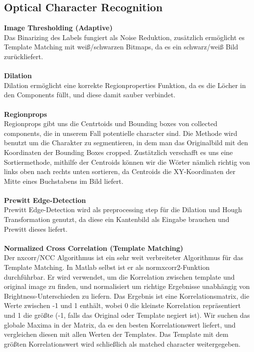 \documentclass[paper=A4, deutsch]{scrartcl}
\begin{document}
\subsection{Optical Character Recognition}
\textbf{Image Thresholding (Adaptive)}\\
Das Binarizing des Labels fungiert als Noise Reduktion, zusätzlich ermöglicht es Template Matching mit weiß/schwarzen Bitmaps, da es ein schwarz/weiß Bild zurückliefert.\\
\\
\textbf{Dilation}\\
Dilation ermöglicht eine korrekte Regionproperties Funktion, da es die Löcher in den Components füllt, und diese damit sauber verbindet.\\
\\
\textbf{Regionprops}\\
Regionprops gibt uns die Centrtoids und Bounding boxes von collected components, die in unserem Fall potentielle character sind. Die Methode wird benutzt um die Charakter zu segmentieren, in dem man das Originalbild mit den Koordinaten der Bounding Boxes cropped. Zustätzlich verschafft es uns eine Sortiermethode, mithilfe der Centroids können wir die Wörter nämlich richtig von links oben nach rechts unten sortieren,
da Centroids die XY-Koordinaten der Mitte eines Buchstabens im Bild liefert.\\
\\
\textbf{Prewitt Edge-Detection}\\
Prewitt Edge-Detection wird als preprocessing step für die Dilation und Hough Transformation genutzt, da diese ein Kantenbild als Eingabe brauchen und Prewitt dieses liefert.\\
\\
\textbf{Normalized Cross Correlation (Template Matching)} \cite{nip}\\
Der nxcorr/NCC Algorithmus ist ein sehr weit verbreiteter Algorithmus für das Template Matching. In Matlab selbst ist er als normxcorr2-Funktion durchführbar. 
Er wird verwendet, um die Korrelation zwischen template und original image zu finden, und normalisiert um richtige Ergebnisse unabhängig von Brightness-Unterschieden zu liefern. Das Ergebnis ist eine Korrelationsmatrix, die Werte zwischen -1 und 1 enthält, wobei 0 die kleinste Korrelation repräsentiert und 1 die größte (-1, falls das Original oder Template negiert ist). Wir suchen das globale Maxima in der Matrix, da es den besten Korrelationswert liefert, und vergleichen diesen mit allen Werten der Templates. Das Template mit dem größten Korrelationswert wird schließlich als matched character weitergegeben.\\
\end{document}
